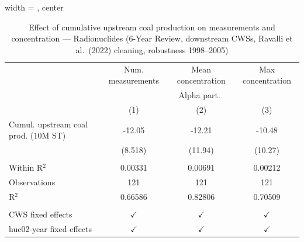 
\begin{table}[htbp]
   
   \caption{\label{tab:6yr_huc02fe_cnt_radio_ravalli_2005} Effect of cumulative upstream coal production on measurements and concentration --- Radionuclides (6-Year Review, downstream CWSs, Ravalli et al.~(2022) cleaning, robustness 1998--2005)}
   \bigskip
   
   \centering
   
   \begin{adjustbox}{width = \textwidth, center}
      
      
      \begin{tabular}{lccc}
         \toprule
         
                                             & Num. measurements & Mean concentration & Max concentration\\  
         
          & \multicolumn{3}{c}{Alpha part.} \\ 
         
                                             & (1)               & (2)                & (3)\\  
         
         \midrule 
         Cumul. upstream coal prod. (10M ST) & -12.05            & -12.21             & -10.48\\   
                                             & (8.518)           & (11.94)            & (10.27)\\   
         
          \\
         
         Within R$^2$                        & 0.00331           & 0.00691            & 0.00212\\  
         Observations                        & 121               & 121                & 121\\  
         R$^2$                               & 0.66586           & 0.82806            & 0.70509\\  
         
          \\
         
         CWS fixed effects                   & $\checkmark$      & $\checkmark$       & $\checkmark$\\   
         huc02-year fixed effects            & $\checkmark$      & $\checkmark$       & $\checkmark$\\   
         

\end{tabular}
\end{adjustbox}
\end{table}
